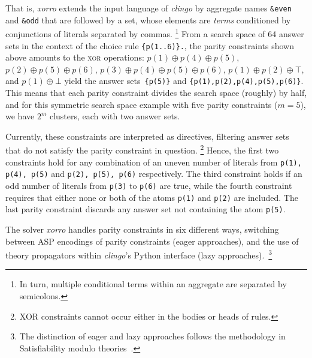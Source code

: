 \documentclass{article}
\newcommand{\XOR}{\textsc{xor}} %
\newcommand{\sysfont}{\textit}
\newcommand{\clingo}{\sysfont{clingo}}
\newcommand{\xorro}{\sysfont{xorro}}
\newcommand{\xor}{\oplus}
\newcommand{\set}[1]{\{#1\}}
\begin{document}
%
That is, \xorro{} extends the input language of \clingo{} by
aggregate names \texttt{\&even} and \texttt{\&odd} that are followed
by a set, whose elements are \emph{terms} conditioned by
conjunctions of literals separated by commas.%
%
\footnote{In turn, multiple conditional terms within an aggregate are
	separated by semicolons.}
%
From a search space of 64 answer sets in the context of the choice rule \texttt{\set{p(1..6)}.}, the parity constraints shown above
amounts to the \XOR{} operations:
$p(1) \xor p(4) \xor p(5)$, $p(2) \xor p(5) \xor p(6)$, $p(3) \xor p(4) \xor p(5) \xor p(6)$, $p(1) \xor p(2) \xor \top$, and $p(1) \xor \bot$
yield the answer sets~\texttt{\set{p(5)}} and \texttt{\set{p(1),p(2),p(4),p(5),p(6)}}.
This means that each parity constraint divides the search space (roughly) by half, and for this symmetric search space example with five parity constraints ($m=5$),
we have $2^m$ clusters, each with two answer sets.


Currently, these constraints are interpreted as directives,
filtering answer sets that do not satisfy the parity constraint in question.
\footnote{XOR constraints cannot occur either in the bodies or heads of rules.}
%
Hence, the first two
constraints hold for any combination of an uneven number of literals from \texttt{p(1), p(4), p(5)} and \texttt{p(2), p(5), p(6)} respectively.
The third constraint holds if an odd number of literals from \texttt{p(3)} to \texttt{p(6)} are true, while the fourth constraint requires that either none or both of
the atoms \texttt{p(1)} and \texttt{p(2)} are included.
The last parity constraint discards any answer set not containing the atom \texttt{p(5)}.

The solver \xorro{} handles parity constraints in six different ways,
switching between ASP encodings of parity constraints (eager approaches), and the use of theory propagators within \clingo{}'s Python interface (lazy approaches).~\footnote{The distinction of eager and lazy approaches follows the methodology in Satisfiability modulo theories~\cite{baseseti09a}.}
\end{document}
